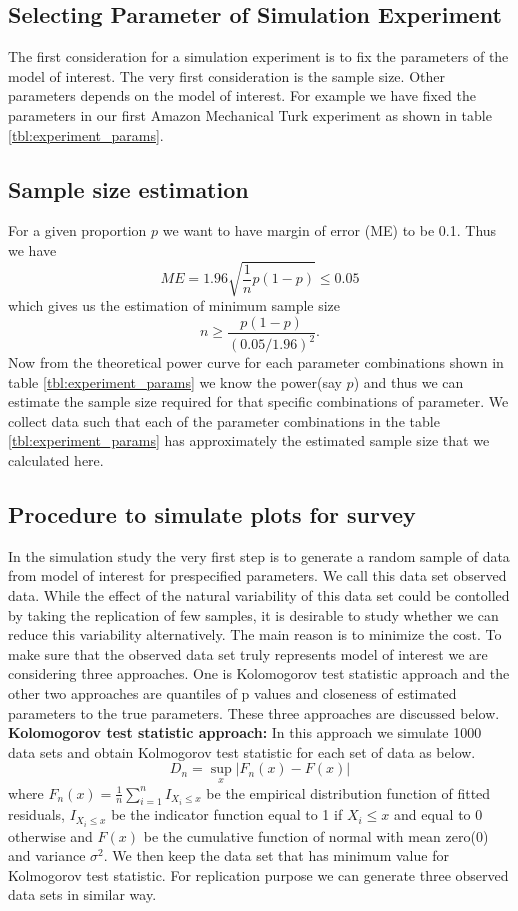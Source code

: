 \documentclass{article}
\begin{document}
\subsection{Selecting Parameter of Simulation Experiment} The first consideration for a simulation experiment is to fix the parameters of the model of interest. The very first consideration is the sample size. Other parameters depends on the model of interest. For example we have fixed the parameters in our first Amazon Mechanical Turk experiment as shown in table \ref{tbl:experiment_params}.

\subsection{Sample size estimation} For a given proportion $p$ we want to have margin of error (ME) to be 0.1. Thus we have $$ME =1.96 \sqrt{ \frac 1 n p(1-p)} \le 0.05$$ which gives us the estimation of minimum sample size $$n \geq \frac{p(1-p)}{(0.05/1.96)^2}.$$ Now from the theoretical power curve for each parameter combinations shown in table \ref{tbl:experiment_params} we know the power(say $p$) and thus we can estimate the sample size required for that specific combinations of parameter. We collect data such that each of the parameter combinations in the table \ref{tbl:experiment_params} has approximately the estimated sample size that we calculated here.


\subsection{Procedure to simulate plots for survey} \label{sec:simulate_plot} In the simulation study the very first step is to generate a random sample of data from model of interest for prespecified parameters. We call this data set observed data. While the effect of the natural variability of this data set could be contolled by taking the replication of few samples, it is desirable to study whether we can reduce this variability alternatively. The main reason is to minimize the cost. To make sure that the observed data set truly represents model of interest we are considering three approaches. One is Kolomogorov test statistic approach and the other two approaches are quantiles of p values and closeness of estimated parameters to the true parameters. These three approaches are discussed below.\\

{\bf Kolomogorov test statistic approach:} In this approach we simulate 1000 data sets and obtain Kolmogorov test statistic for each set of data as below. $$D_n=\sup_x |F_n(x)-F(x)|$$ where $F_n(x)=\frac1n \sum_{i=1}^n I_{X_i\le x}$ be the empirical distribution function of fitted residuals, $I_{X_i\le x}$ be the indicator function equal to 1 if $X_i\le x$ and equal to 0 otherwise and $F(x)$ be the cumulative function of normal with mean zero(0) and variance $\sigma^2$. We then keep the data set that has minimum value for Kolmogorov test statistic.  For replication purpose we can generate three observed data sets in similar way.\\
\end{document}
